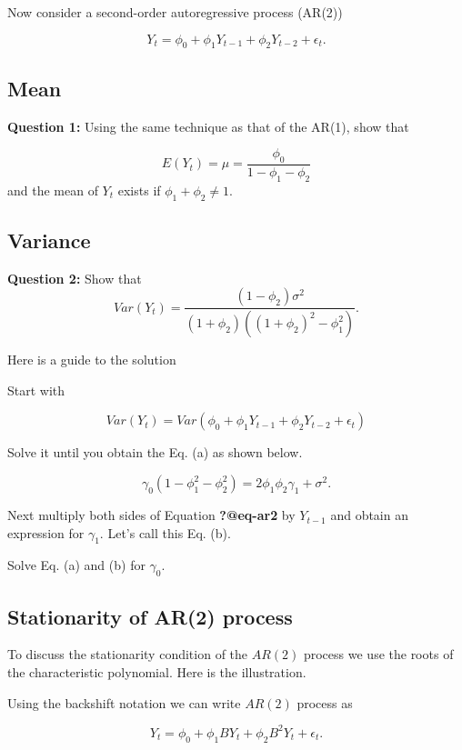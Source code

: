 \documentclass[
  11pt,
  a4paper,
]{report}
\begin{document}
Now consider a second-order autoregressive process (AR(2))

\begin{equation}
Y_t=\phi_0+\phi_1Y_{t-1}+\phi_2Y_{t-2}+\epsilon_t.
\end{equation}

\subsection{Mean}\label{mean-1}

\textbf{Question 1:} Using the same technique as that of the AR(1), show
that

\[E(Y_t) = \mu = \frac{\phi_0}{1-\phi_1 - \phi_2}\] and the mean of
\(Y_t\) exists if \(\phi_1 + \phi_2 \neq 1\).

\subsection{Variance}\label{variance}

\textbf{Question 2:} Show that
\[Var(Y_t) = \frac{(1-\phi_2)\sigma^2}{(1+\phi_2)((1+\phi_2)^2-\phi_1^2)}.\]

Here is a guide to the solution

Start with

\[Var(Y_t)=Var(\phi_0+\phi_1Y_{t-1}+\phi_2Y_{t-2}+\epsilon_t)\]

Solve it until you obtain the Eq. (a) as shown below.

\begin{equation}
\gamma_0 (1-\phi_1^2 - \phi_2^2) = 2\phi_1\phi_2\gamma_1+\sigma^2.
\end{equation}

Next multiply both sides of Equation \textbf{?@eq-ar2} by \(Y_{t-1}\)
and obtain an expression for \(\gamma_1\). Let's call this Eq. (b).

Solve Eq. (a) and (b) for \(\gamma_0.\)

\subsection{Stationarity of AR(2)
process}\label{stationarity-of-ar2-process}

To discuss the stationarity condition of the \(AR(2)\) process we use
the roots of the characteristic polynomial. Here is the illustration.

Using the backshift notation we can write \(AR(2)\) process as

\[Y_t = \phi_0 + \phi_1 BY_{t} + \phi_2 B^2 Y_{t} + \epsilon_t.\]
\end{document}
